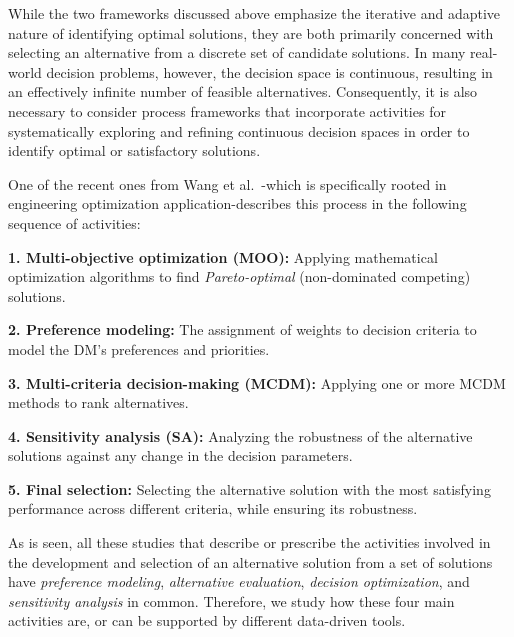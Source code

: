 \documentclass{sfuthesis}
\begin{document}
While the two frameworks discussed above emphasize the iterative and adaptive nature of identifying optimal solutions, they are both primarily concerned with selecting an alternative from a discrete set of candidate solutions. In many real-world decision problems, however, the decision space is continuous, resulting in an effectively infinite number of feasible alternatives. Consequently, it is also necessary to consider process frameworks that incorporate activities for systematically exploring and refining continuous decision spaces in order to identify optimal or satisfactory solutions.\par 
One of the recent ones from Wang et al.~\cite{wang2024multi}-which is specifically rooted in engineering optimization application-describes this process in the following sequence of activities:\par
\textbf{1. Multi-objective optimization (MOO):} Applying mathematical optimization algorithms to find \textit{Pareto-optimal} (non-dominated competing) solutions.\par
\textbf{2. Preference modeling:} The assignment of weights to decision criteria to model the DM's preferences and priorities.\par
\textbf{3. Multi-criteria decision-making (MCDM):} Applying one or more MCDM methods to rank alternatives.\par
\textbf{4. Sensitivity analysis (SA):} Analyzing the robustness of the alternative solutions against any change in the decision parameters.\par
\textbf{5. Final selection:} Selecting the alternative solution with the most satisfying performance across different criteria, while ensuring its robustness.\par
As is seen, all these studies that describe or prescribe the activities involved in the development and selection of an alternative solution from a set of solutions have \textit{preference modeling}, \textit{alternative evaluation}, \textit{decision optimization}, and \textit{sensitivity analysis} in common. Therefore, we study how these four main activities are, or can be supported by different data-driven tools.
\end{document}
